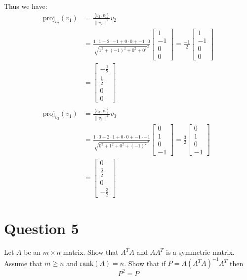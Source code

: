 \documentclass{article}
\begin{document}
Thus we have:
\begin{align*}
    \text{proj}_{v_2}(v_1) &= \frac{\langle v_2, v_1 \rangle}{\|v_2\|^2} v_2 \\
                           &= \frac{1 \cdot 1 + 2 \cdot -1 + 0 \cdot 0 + -1 \cdot 0}{\sqrt{1^2 + (-1)^2 + 0^2 + 0^2}^2} \begin{bmatrix} 1 \\ -1 \\ 0 \\ 0 \end{bmatrix}
                           = \frac{-1}{2} \begin{bmatrix} 1 \\ -1 \\ 0 \\ 0 \end{bmatrix} \\
                            &= \begin{bmatrix} -\frac{1}{2} \\ \frac{1}{2} \\ 0 \\ 0 \end{bmatrix} \\
    \\
    \text{proj}_{v_3}(v_1) &= \frac{\langle v_3, v_1 \rangle}{\|v_3\|^2} v_3 \\
                            &= \frac{1 \cdot 0 + 2 \cdot 1 + 0 \cdot 0 + -1 \cdot -1}{\sqrt{0^2 + 1^2 + 0^2 + (-1)^2}^2} \begin{bmatrix} 0 \\ 1 \\ 0 \\ -1 \end{bmatrix}
                            = \frac{3}{2} \begin{bmatrix} 0 \\ 1 \\ 0 \\ -1 \end{bmatrix} \\
                             &= \begin{bmatrix} 0 \\ \frac{3}{2} \\ 0 \\ -\frac{3}{2} \end{bmatrix}
\end{align*}

\newpage
\section*{Question 5}
Let $A$ be an $m \times n$ matrix. Show that $A^T A$ and $AA^T$ is a symmetric matrix.
Assume that $m \geq n$ and $\text{rank}(A) = n$.
Show that if $P=A(A^T A)^{-1}A^T$ then $$ P^2 = P $$
\end{document}
